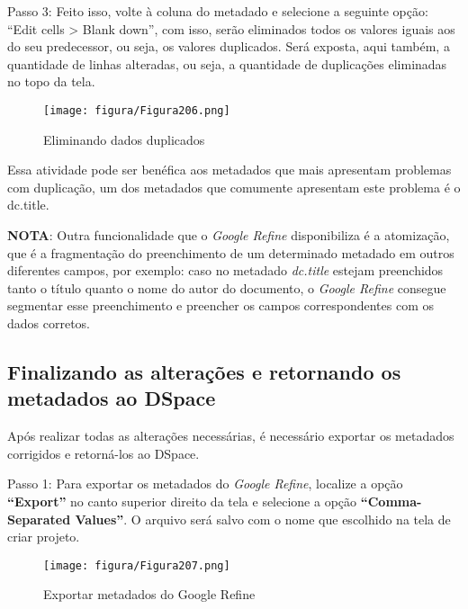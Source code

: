 \documentclass[12pt,hidelinks]{article}
\begin{document}
    Passo 3: Feito isso, volte à coluna do metadado e selecione a seguinte opção: “Edit cells > Blank down”, com isso, serão eliminados todos os valores iguais aos do seu predecessor, ou seja, os valores duplicados. Será exposta, aqui também, a quantidade de linhas alteradas, ou seja, a quantidade de duplicações eliminadas no topo da tela.
    
    \begin{figure}[!htp]
                \centering
                \texttt{[image: figura/Figura206.png]}
                \caption{Eliminando dados duplicados}
            \label{Rotulo}
        \end{figure}
    
\newpage
    
    Essa atividade pode ser benéfica aos metadados que mais apresentam problemas com duplicação, um dos metadados que comumente apresentam este problema é o dc.title.
    
    \textbf{NOTA}: Outra funcionalidade que o \textit{Google Refine} disponibiliza é a atomização, que é a fragmentação do preenchimento de um determinado metadado em outros diferentes campos, por exemplo: caso no metadado \textit{dc.title} estejam preenchidos tanto o título quanto o nome do autor do documento, o \textit{Google Refine} consegue segmentar esse preenchimento e preencher os campos correspondentes com os dados corretos.
    
    \singlespacing
    
    \subsection{Finalizando as alterações e retornando os metadados ao DSpace}
    
    Após realizar todas as alterações necessárias, é necessário exportar os metadados corrigidos e retorná-los ao DSpace.
    
    \singlespacing
    
    Passo 1: Para exportar os metadados do \textit{Google Refine}, localize a opção \textbf{“Export”} no canto superior direito da tela e selecione a opção \textbf{“Comma-Separated Values”}. O arquivo será salvo com o nome que escolhido na tela de criar projeto.
    
    \begin{figure}[!htp]
                \centering
                \texttt{[image: figura/Figura207.png]}
                \caption{Exportar metadados do Google Refine}
            \label{Rotulo}
        \end{figure}
    
\end{document}
